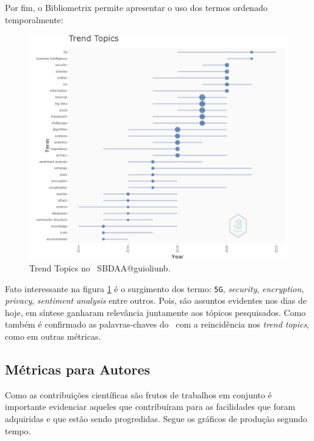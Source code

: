 Por fim, o Bibliometrix permite apresentar o uso dos termos ordenado temporalmente:
\begin{figure}
    \centering
    \includegraphics[width=1\textwidth]{experiments/guioliunb/AnaliseBibliometrica/SocialBigDataAnalysis/TREND TOPICS.png}
    \caption{Trend Topics no \dataset\ SBDAA@guioliunb.}
    \label{fig:trend:topics}
\end{figure}

Fato interessante na figura \ref{fig:trend:topics} é o surgimento dos termo: \texttt{5G}, \textit{security}, \textit{encryption}, \textit{privacy}, \textit{sentiment analysis} entre outros. Pois, são assuntos evidentes nos dias de hoje, em síntese ganharam relevância juntamente aos tópicos pesquisados.
Como também é confirmado as palavras-chaves do \dataset\ com a reincidência nos \textit{trend topics}, como em outras métricas.


\subsection{Métricas para Autores}

Como as contribuições científicas são frutos de trabalhos em conjunto é importante evidenciar aqueles que contribuíram para as facilidades que foram adquiridas e que estão sendo progredidas. Segue os gráficos de produção segundo tempo.


